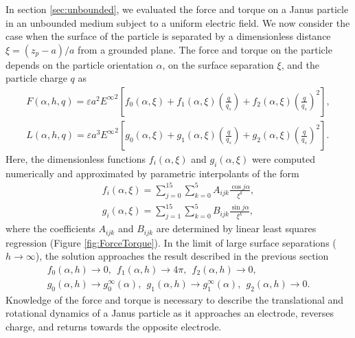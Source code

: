 \begin{appendices}
In section \ref{sec:unbounded}, we evaluated the force and torque on a Janus particle in an unbounded medium subject to a uniform electric field.  We now consider the case when the surface of the particle is separated by a dimensionless distance $\xi=(z_p-a) / a$ from a grounded plane.  The force and torque on the particle depends on the particle orientation $\alpha$, on the surface separation $\xi$, and the particle charge $q$ as
\begin{gather}
    F(\alpha,h,q) = \varepsilon a^2 {E^{\infty}}^2 \left[f_0(\alpha,\xi) + f_1(\alpha,\xi) \left(\frac{q}{q_s}\right)  + f_2(\alpha,\xi)\left(\frac{q}{q_s}\right)^2 \right], \label{eq:Force}
    \\
    L(\alpha,h,q) = \varepsilon a^3 {E^{\infty}}^2 \left[g_0(\alpha,\xi) + g_1(\alpha,\xi) \left(\frac{q}{q_s}\right)  + g_2(\alpha,\xi)\left(\frac{q}{q_s}\right)^2 \right].\label{eq:Torque}
\end{gather}
Here, the dimensionless functions $f_i(\alpha,\xi)$ and $g_i(\alpha,\xi)$ were computed numerically and approximated by parametric interpolants of the form
\begin{gather}
    f_i(\alpha,\xi) = \sum_{j=0}^{15}\sum_{k=0}^5 A_{ijk} \frac{\cos j\alpha}{\xi^k},\label{eq:ForceInterpolant}
    \\
    g_i(\alpha,\xi) = \sum_{j=1}^{15}\sum_{k=0}^5 B_{ijk} \frac{\sin j\alpha}{\xi^k},\label{eq:TorqueInterpolant}
\end{gather}
where the coefficients $A_{ijk}$ and $B_{ijk}$ are determined by linear least squares regression (Figure \ref{fig:ForceTorque}). In the limit of large surface separations ($h\rightarrow\infty$), the solution approaches the result described in the previous section 
\begin{gather}
    f_0(\alpha,h)\rightarrow0,~~ f_1(\alpha,h)\rightarrow4\pi,~~ f_2(\alpha,h)\rightarrow0,
    \\
    g_0(\alpha,h)\rightarrow g_0^{\infty}(\alpha),~~ g_1(\alpha,h)\rightarrow g_1^{\infty}(\alpha),~~ g_2(\alpha,h)\rightarrow0.
\end{gather}
Knowledge of the force and torque is necessary to describe the translational and rotational dynamics of a Janus particle as it approaches an electrode, reverses charge, and returns towards the opposite electrode.


\end{appendices}
